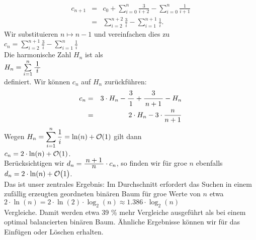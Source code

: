 \begin{eqnarray*}  
  c_{n+1} & = & c_0 + \sum\limits_{i=0}^{n} \frac{3}{i+2} - \sum\limits_{i=0}^{n} \frac{1}{i+1} 
\\[0.2cm]
          & = & \sum\limits_{i=2}^{n+2} \frac{3}{i} - \sum\limits_{i=1}^{n+1} \frac{1}{i}.
\end{eqnarray*}
Wir substituieren $n \mapsto n-1$ und vereinfachen dies zu 
\\[0.2cm]
\hspace*{1.3cm}
$c_{n} =  \displaystyle\sum\limits_{i=2}^{n+1} \frac{3}{i} - \sum\limits_{i=1}^{n} \frac{1}{i}$
\\[0.2cm]
Die harmonische Zahl $H_n$ ist als
\\[0.2cm]
\hspace*{1.3cm}
$H_n = \sum\limits_{i=1}^{n} \bruch{1}{i}$   
\\[0.2cm]
definiert.  Wir k\"onnen $c_n$ auf $H_n$ zur\"uckf\"uhren: 
\begin{eqnarray*}
   c_n & = & 3 \cdot H_n - \bruch{3}{1} + \bruch{3}{n+1} - H_n \\
       & = & 2 \cdot H_n - 3 \cdot \frac{n}{n+1} 
\end{eqnarray*}
Wegen $H_n = \displaystyle\sum\limits_{i=1}^{n} \frac{1}{i} = \ln(n) + \mathcal{O}(1)$ gilt dann \\[0.2cm]
\hspace*{1.3cm} 
$\displaystyle c_n = 2 \cdot \ln(n) + \mathcal{O}(1)$.
\\[0.2cm]
Ber\"ucksichtigen wir  $d_n = \bruch{n+1}{n}\cdot c_n$, so finden wir f\"ur gro\3e $n$ ebenfalls \\[0.2cm]
\hspace*{1.3cm} $\displaystyle d_n = 2 \cdot \ln(n) + \mathcal{O}\bigl(1\bigr)$.
\\[0.2cm]
Das ist unser zentrales Ergebnis: Im Durchschnitt erfordert das Suchen in einem zuf\"allig
erzeugten geordneten bin\"aren Baum f\"ur gro\3e Werte von $n$ etwa 
\\[0.2cm]
\hspace*{1.3cm}
$2 \cdot \ln(n) = 2 \cdot \ln(2) \cdot \log_2(n) \approx 1.386 \cdot \log_2(n)$ 
\\[0.2cm]
Vergleiche.  Damit werden etwa 39 \% 
mehr Vergleiche ausgef\"uhrt als bei einem optimal balancierten bin\"aren Baum.
\"Ahnliche Ergebnisse k\"onnen wir f\"ur das Einf\"ugen oder L\"oschen erhalten.

